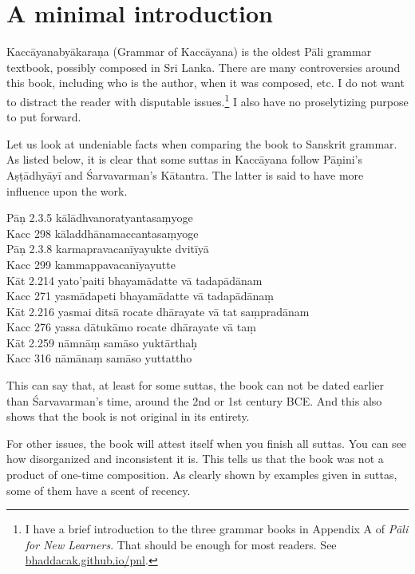 \cleardoublepage
{}
{}
\chapter*{A minimal introduction}

Kaccāyanabyākaraṇa (Grammar of Kaccāyana) is the oldest Pāli grammar textbook, possibly composed in Sri Lanka. There are many controversies around this book, including who is the author, when it was composed, etc. I do not want to distract the reader with disputable issues.\footnote{I have a brief introduction to the three grammar books in Appendix A of \emph{Pāli for New Learners}. That should be enough for most readers. See \url{bhaddacak.github.io/pnl}.} I also have no proselytizing purpose to put forward.

Let us look at undeniable facts when comparing the book to Sanskrit grammar. As listed below, it is clear that some suttas in Kaccāyana follow Pāṇini's Aṣṭādhyāyī and Śarvavarman's Kātantra. The latter is said to have more influence upon the work.

\bigskip
{\small\noindent
Pāṇ 2.3.5 kālādhvanoratyantasaṃyoge\\
Kacc 298 kāladdhānamaccantasaṃyoge\\[1mm]
Pāṇ 2.3.8 karmapravacanīyayukte dvitīyā\\
Kacc 299 kammappavacanīyayutte\\[1mm]
Kāt 2.214 yato'paiti bhayamādatte vā tadapādānam\\
Kacc 271 yasmādapeti bhayamādatte vā tadapādānaṃ\\[1mm]
Kāt 2.216 yasmai ditsā rocate dhārayate vā tat saṃpradānam\\
Kacc 276 yassa dātukāmo rocate dhārayate vā taṃ\\[1mm]
Kāt 2.259 nāmnāṃ samāso yuktārthaḥ\\
Kacc 316 nāmānaṃ samāso yuttattho\\
}

This can say that, at least for some suttas, the book can not be dated earlier than Śarvavarman's time, around the 2nd or 1st century BCE. And this also shows that the book is not original in its entirety.

For other issues, the book will attest itself when you finish all suttas. You can see how disorganized and inconsistent it is. This tells us that the book was not a product of one-time composition. As clearly shown by examples given in suttas, some of them have a scent of recency.

